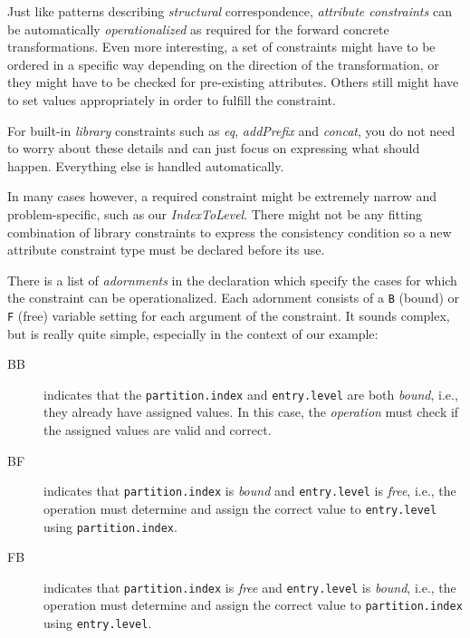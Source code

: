 Just like patterns describing \emph{structural} correspondence, \emph{attribute constraints} can be automatically \emph{operationalized} as required for
the forward concrete transformations. Even more interesting, a set of constraints might have to be ordered in a specific way depending on
the direction of the transformation, or they might have to be checked for pre-existing attributes. Others still might have to set values appropriately in
order to fulfill the constraint.

For built-in \emph{library} constraints such as \emph{eq}, \emph{addPrefix} and \emph{concat}, you do not need to worry about these details and can just focus
on expressing what should happen. Everything else is handled automatically.

In many cases however, a required constraint might be extremely narrow and problem-specific, such as our \emph{IndexToLevel}. There might not be any
fitting combination of library constraints to express the consistency condition so a new attribute constraint type must be declared before its use.

There is a list of \emph{adornments} in the declaration which specify the cases for which the constraint can be operationalized. Each adornment consists of a
\texttt{B} (bound) or \texttt{F} (free) variable setting for each argument of the constraint. It sounds complex, but is really quite simple, especially in
the context of our example:

\begin{description}

\item[BB] indicates that the \texttt{partition.index} and \texttt{entry.level} are both \emph{bound}, i.e., they already have assigned values.
In this case, the \emph{operation} must check if the assigned values are valid and correct.

\item[BF] indicates that \texttt{partition.index} is \emph{bound} and \texttt{entry.level} is \emph{free}, i.e., the operation must determine and assign the
correct value to \texttt{entry.level} using \texttt{partition.index}.

\item[FB] indicates that \texttt{partition.index} is \emph{free} and \texttt{entry.level} is \emph{bound}, i.e., the operation must determine and assign the
correct value to \texttt{parti\-tion.in\-dex} using \texttt{entry.level}.

\end{description}

